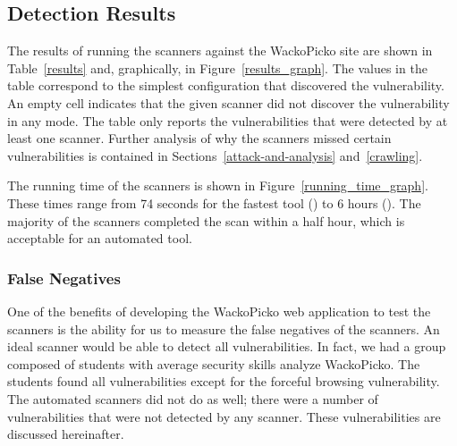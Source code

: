 


\subsection{Detection Results}
The results of running the scanners against the WackoPicko site are
shown in Table~\ref{results} and, graphically, in
Figure~\ref{results_graph}.
%
The values in the table correspond to the
simplest  configuration that discovered the vulnerability. An empty cell indicates that
the given scanner did not discover the vulnerability in any
mode. The table only reports the vulnerabilities that were detected by at least one scanner.
Further analysis of why the scanners missed
certain vulnerabilities is contained in Sections~\ref{attack-and-analysis}
and~\ref{crawling}. 

The running time of the scanners is shown in Figure~\ref{running_time_graph}.
These times range from 74 seconds for the fastest tool (\burp{}) to 6
hours (\nstalker{}). The majority of the scanners completed the
scan within a half hour, which is acceptable for an automated tool. 


\subsubsection{False Negatives}

One of the benefits of developing the WackoPicko web application to
test the scanners is the ability for us to measure the false negatives
of the scanners. An ideal scanner would be able to detect all
vulnerabilities. In fact, we had a group composed of students with 
average security skills 
analyze WackoPicko. The students found all vulnerabilities
except for the forceful browsing vulnerability. The automated
scanners did not do as well; there were a number of vulnerabilities
that were not detected by any scanner. These vulnerabilities are
discussed hereinafter.

